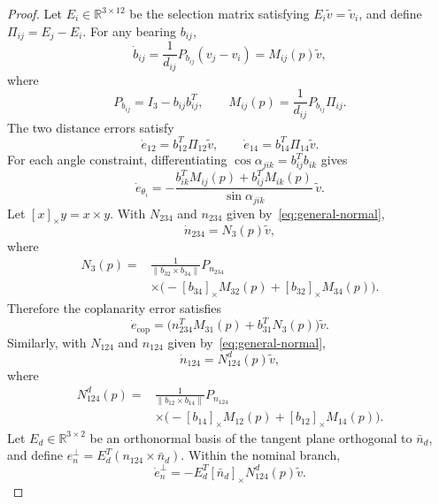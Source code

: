 \documentclass[letterpaper,journal]{IEEEtran}
\theoremstyle{plain}
\theoremstyle{definition}
\theoremstyle{remark}
\begin{document}
\begin{proof}
Let \(E_i\in\mathbb R^{3\times12}\) be the selection matrix satisfying \(E_i\tilde v=\tilde v_i\), and define \(\Pi_{ij}=E_j-E_i\). For any bearing \(b_{ij}\),
\begin{equation}
\dot b_{ij}=\frac{1}{d_{ij}}P_{b_{ij}}(v_j-v_i)=M_{ij}(p)\tilde v,
\label{eq:bdot}
\end{equation}
where
\begin{equation}
P_{b_{ij}}=I_3-b_{ij}b_{ij}^T,\qquad
M_{ij}(p)=\frac{1}{d_{ij}}P_{b_{ij}}\Pi_{ij}.
\label{eq:Mij-def}
\end{equation}
The two distance errors satisfy
\begin{equation}
\dot e_{12}=b_{12}^T\Pi_{12}\tilde v,\qquad
\dot e_{14}=b_{14}^T\Pi_{14}\tilde v.
\label{eq:distance-derivatives}
\end{equation}
For each angle constraint, differentiating \(\cos\alpha_{jik}=b_{ij}^Tb_{ik}\) gives
\begin{equation}
\dot e_{\theta_i}=
-\frac{b_{ik}^{T}M_{ij}(p)+b_{ij}^{T}M_{ik}(p)}
{\sin\alpha_{jik}}\,\tilde v .
\label{eq:alphadot}
\end{equation}
Let \([x]_\times y=x\times y\). With \(N_{234}\) and \(n_{234}\) given by~\eqref{eq:general-normal},
\begin{equation}
\dot n_{234}=N_3(p)\tilde v,
\label{eq:n234dot}
\end{equation}
where
\begin{equation}
\begin{aligned}
N_3(p)=&\frac{1}{\|b_{32}\times b_{34}\|}P_{n_{234}}\\
&\times\bigl(-[b_{34}]_\times M_{32}(p)+[b_{32}]_\times M_{34}(p)\bigr).
\end{aligned}
\label{eq:N3-def}
\end{equation}
Therefore the coplanarity error satisfies
\begin{equation}
\dot e_{\mathrm{cop}}
=\bigl(n_{234}^TM_{31}(p)+b_{31}^TN_3(p)\bigr)\tilde v.
\label{eq:cop-derivative}
\end{equation}
Similarly, with \(N_{124}\) and \(n_{124}\) given by~\eqref{eq:general-normal},
\begin{equation}
\dot n_{124}=N_{124}^{d}(p)\tilde v,
\label{eq:n124dot}
\end{equation}
where
\begin{equation}
\begin{aligned}
N_{124}^{d}(p)=
&\frac{1}{\|b_{12}\times b_{14}\|}P_{n_{124}}\\
&\times\bigl(-[b_{14}]_\times M_{12}(p)+[b_{12}]_\times M_{14}(p)\bigr).
\end{aligned}
\label{eq:N124d-def}
\end{equation}
Let \(E_d\in\mathbb R^{3\times2}\) be an orthonormal basis of the tangent plane orthogonal to \(\bar n_d\), and define \(e_n^\perp=E_d^T(n_{124}\times\bar n_d)\). Within the nominal branch,
\begin{equation}
\dot e_n^\perp=-E_d^T[\bar n_d]_\times N_{124}^{d}(p)\tilde v.
\label{eq:normal-derivative}
\end{equation}


\end{proof}
\end{document}
